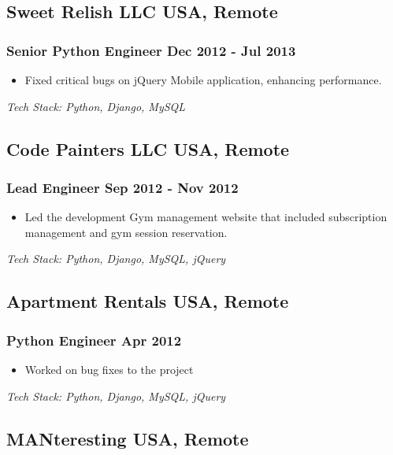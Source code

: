 \documentclass[11pt]{article} %
\newcommand \techstack [1]
    {\small\textit{Tech Stack: {#1}}} %
\begin{document}
\subsection{Sweet Relish LLC \hfill USA, Remote}
\subsubsection{Senior Python Engineer \hfill  Dec 2012 - Jul 2013}
\begin{itemize}
    \item Fixed critical bugs on jQuery Mobile application, enhancing performance.
\end{itemize}
\techstack{Python, Django, MySQL}
\vspace{0.8em}

\subsection{Code Painters LLC \hfill USA, Remote}
\subsubsection{Lead Engineer \hfill  Sep 2012 - Nov 2012}
\begin{itemize}
    \item Led the development Gym management website that included subscription management and gym session reservation.
\end{itemize}
\techstack{Python, Django, MySQL, jQuery}
\vspace{0.8em}

\subsection{Apartment Rentals \hfill USA, Remote}
\subsubsection{Python Engineer \hfill  Apr 2012}
\begin{itemize}
    \item Worked on bug fixes to the project
\end{itemize}
\techstack{Python, Django, MySQL, jQuery}
\vspace{0.8em}

\subsection{MANteresting \hfill USA, Remote}
\end{document}
